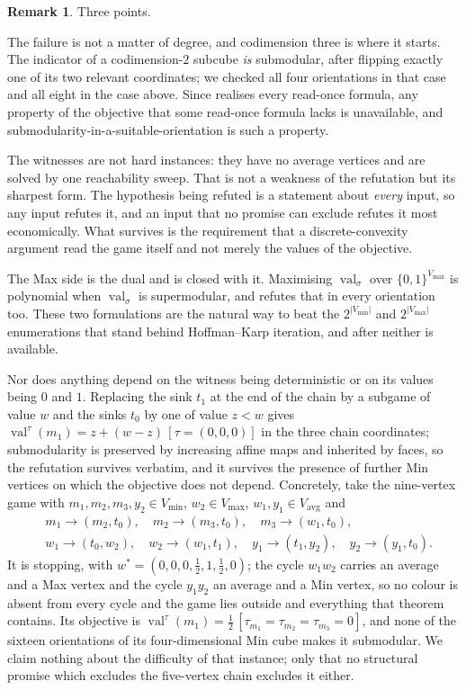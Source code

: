 \documentclass[11pt]{article}
\theoremstyle{plain}
\theoremstyle{definition}
\newtheorem{remark}[theorem]{Remark}
\DeclareMathOperator{\val}{val}
\newcommand{\Vmax}{V_{\max}}
\newcommand{\Vmin}{V_{\min}}
\newcommand{\Vavg}{V_{\mathrm{avg}}}
\begin{document}
\begin{remark}\label{rem:no-submodular}
Three points.

The failure is not a matter of degree, and codimension three is where it starts.
The indicator of a codimension-$2$ subcube \emph{is} submodular, after flipping
exactly one of its two relevant coordinates; we checked all four orientations in
that case and all eight in the case above. Since  realises
every read-once formula, any property of the objective that some read-once
formula lacks is unavailable, and submodularity-in-a-suitable-orientation is
such a property.

The witnesses are not hard instances: they have no average vertices and are
solved by one reachability sweep. That is not a weakness of the refutation but
its sharpest form. The hypothesis being refuted is a statement about
\emph{every} input, so any input refutes it, and an input that no promise can
exclude refutes it most economically. What survives is the requirement that a
discrete-convexity argument read the game itself and not merely the values of
the objective.

The Max side is the dual and is closed with it. Maximising $\val_\sigma$ over
$\{0,1\}^{\Vmax}$ is polynomial when $\val_\sigma$ is supermodular, and
 refutes that in every orientation too. These two
formulations are the natural way to beat the $2^{|\Vmin|}$ and $2^{|\Vmax|}$
enumerations that stand behind Hoffman--Karp iteration, and after
 neither is available.

Nor does anything depend on the witness being deterministic or on its values
being $0$ and $1$. Replacing the sink $t_1$ at the end of the chain by a
subgame of value $w$ and the sinks $t_0$ by one of value $z<w$ gives
$\val^{\tau}(m_1)=z+(w-z)\,[\tau=(0,0,0)]$ in the three chain coordinates;
submodularity is preserved by increasing affine maps and inherited by faces, so
the refutation survives verbatim, and it survives the presence of further Min
vertices on which the objective does not depend. Concretely, take the
nine-vertex game with $m_1,m_2,m_3,y_2\in\Vmin$, $w_2\in\Vmax$,
$w_1,y_1\in\Vavg$ and
\[
  \begin{aligned}
  &m_1\to(m_2,t_0),\quad m_2\to(m_3,t_0),\quad m_3\to(w_1,t_0),\\
  &w_1\to(t_0,w_2),\quad w_2\to(w_1,t_1),\quad
   y_1\to(t_1,y_2),\quad y_2\to(y_1,t_0).
  \end{aligned}
\]
It is stopping, with $w^{\ast}=(0,0,0,\tfrac12,1,\tfrac12,0)$; the cycle
$w_1w_2$ carries an average and a Max vertex and the cycle $y_1y_2$ an average
and a Min vertex, so no colour is absent from every cycle and the game lies
outside  and everything that theorem contains. Its objective
is $\val^{\tau}(m_1)=\tfrac12\,[\tau_{m_1}=\tau_{m_2}=\tau_{m_3}=0]$, and none
of the sixteen orientations of its four-dimensional Min cube makes it
submodular. We claim nothing about the difficulty of that instance; only that no
structural promise which excludes the five-vertex chain excludes it either.
\end{remark}
\end{document}
